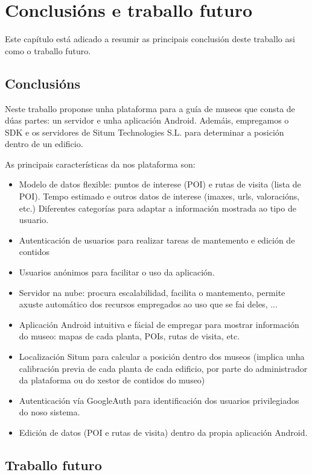 \chapter{Conclusións e traballo futuro}

Este capítulo está adicado a resumir as principais conclusión deste traballo asi como o traballo futuro.



\section{Conclusións}

Neste traballo proponse unha plataforma para a guía de museos que consta de dúas partes: un servidor e unha aplicación Android.
Ademáis, empregamos o SDK e os servidores de Situm Technologies S.L. para determinar a posición dentro de un edificio.

As principais características da nos plataforma son:
\begin{itemize}
 \item Modelo de datos flexible: puntos de interese (POI) e rutas de visita (lista de POI). Tempo estimado e outros datos de interese (imaxes, urls, valoracións, etc.)
 Diferentes categorías para adaptar a información mostrada ao tipo de usuario.
 \item Autenticación de usuarios para realizar tareas de mantemento e edición de contidos
 \item Usuarios anónimos para facilitar o uso da aplicación.
 \item Servidor na nube: procura escalabilidad, facilita o mantemento, permite axuste automático dos recursos empregados ao uso que se fai deles, ...
 \item Aplicación Android intuitiva e fácial de empregar para mostrar información do museo: mapas de cada planta, POIs, rutas de visita, etc.
 \item Localización Situm para calcular a posición dentro dos museos 
 (implica unha calibración previa de cada planta de cada edificio, por parte do administrador da plataforma ou do xestor de contidos do museo)
 \item Autenticación vía GoogleAuth para identificación dos usuarios privilegiados do noso sistema.
 \item Edición de datos (POI e rutas de visita) dentro da propia aplicación Android.
\end{itemize}




\section{Traballo futuro}

